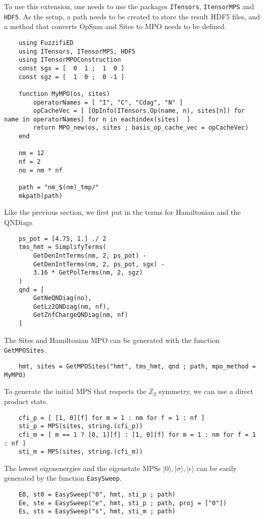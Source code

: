 \documentclass{timesjhep}
\begin{document}
To use this extension, one needs to use the packages \lstinline|ITensors|, \lstinline|ItensorMPS| and \lstinline|HDF5|. As the setup, a path needs to be created to store the result HDF5 files, and a method that converts OpSum and Sites to MPO needs to be defined. 
\begin{lstlisting}
    using FuzzifiED
    using ITensors, ITensorMPS, HDF5
    using ITensorMPOConstruction
    const sgx = [  0  1 ;  1  0 ]
    const sgz = [  1  0 ;  0 -1 ]

    function MyMPO(os, sites)
        operatorNames = [ "I", "C", "Cdag", "N" ]
        opCacheVec = [ [OpInfo(ITensors.Op(name, n), sites[n]) for name in operatorNames] for n in eachindex(sites)  ]
        return MPO_new(os, sites ; basis_op_cache_vec = opCacheVec)
    end

    nm = 12
    nf = 2
    no = nm * nf

    path = "nm_$(nm)_tmp/"
    mkpath(path)
\end{lstlisting}
Like the previous section, we first put in the terms for Hamiltonian and the QNDiags 
\begin{lstlisting}
    ps_pot = [4.75, 1.] ./ 2
    tms_hmt = SimplifyTerms(
        GetDenIntTerms(nm, 2, ps_pot) - 
        GetDenIntTerms(nm, 2, ps_pot, sgx) - 
        3.16 * GetPolTerms(nm, 2, sgz)
    )
    qnd = [ 
        GetNeQNDiag(no), 
        GetLz2QNDiag(nm, nf), 
        GetZnfChargeQNDiag(nm, nf) 
    ]
\end{lstlisting}
The Sites and Hamiltonian MPO can be generated with the function \lstinline|GetMPOSites|. 
\begin{lstlisting}
    hmt, sites = GetMPOSites("hmt", tms_hmt, qnd ; path, mpo_method = MyMPO)
\end{lstlisting}
To generate the initial MPS that respects the $\mathbb{Z}_2$ symmetry, we can use a direct product state. 
\begin{lstlisting}
    cfi_p = [ [1, 0][f] for m = 1 : nm for f = 1 : nf ]
    sti_p = MPS(sites, string.(cfi_p))
    cfi_m = [ m == 1 ? [0, 1][f] : [1, 0][f] for m = 1 : nm for f = 1 : nf ]
    sti_m = MPS(sites, string.(cfi_m))
\end{lstlisting}
The lowest eigenenergies and the eigenstate MPSs $|0\rangle,|\sigma\rangle,|\epsilon\rangle$ can be easily generated by the function \lstinline|EasySweep|.
\begin{lstlisting}
    E0, st0 = EasySweep("0", hmt, sti_p ; path)
    Ee, ste = EasySweep("e", hmt, sti_p ; path, proj = ["0"])
    Es, sts = EasySweep("s", hmt, sti_m ; path)
\end{lstlisting}
\end{document}
